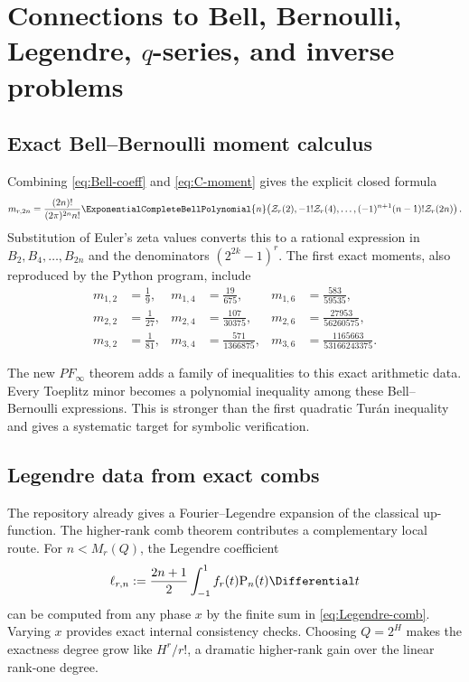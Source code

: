 \documentclass[11pt,oneside]{article}
\theoremstyle{definition}
\theoremstyle{remark}
\newcommand{\ZetaR}{\mathcal Z}
\begin{document}
\section{Connections to Bell, Bernoulli, Legendre, \texorpdfstring{$q$}{q}-series, and inverse problems}

\subsection{Exact Bell--Bernoulli moment calculus}

Combining \eqref{eq:Bell-coeff} and \eqref{eq:C-moment} gives the explicit
closed formula
\begin{equation}\label{eq:moment-Bell}
 m_{r,2n}=\frac{(2n)!}{(2\pi)^{2n}n!}
 \ExponentialCompleteBellPolynomial{n}\!\left(
 \ZetaR_r(2),-1!\ZetaR_r(4),\ldots,
 (-1)^{n+1}(n-1)!\ZetaR_r(2n)
 \right).
\end{equation}
Substitution of Euler's zeta values converts this to a rational expression in
$B_2,B_4,\ldots,B_{2n}$ and the denominators
$(2^{2k}-1)^r$.  The first exact moments, also reproduced by the Python
program, include
\begin{align*}
 m_{1,2}&=\frac19,&m_{1,4}&=\frac{19}{675},&m_{1,6}&=\frac{583}{59535},\\
 m_{2,2}&=\frac1{27},&m_{2,4}&=\frac{107}{30375},&m_{2,6}&=\frac{27953}{56260575},\\
 m_{3,2}&=\frac1{81},&m_{3,4}&=\frac{571}{1366875},&m_{3,6}&=\frac{1165663}{53166243375}.
\end{align*}

The new $PF_\infty$ theorem adds a family of inequalities to this exact
arithmetic data.  Every Toeplitz minor becomes a polynomial inequality among
these Bell--Bernoulli expressions.  This is stronger than the first quadratic
Tur\'an inequality and gives a systematic target for symbolic verification.

\subsection{Legendre data from exact combs}

The repository already gives a Fourier--Legendre expansion of the classical
up-function.  The higher-rank comb theorem contributes a complementary local
route.  For $n<M_r(Q)$, the Legendre coefficient
\begin{equation}\label{eq:Legendre-coeff}
 \ell_{r,n}:=\frac{2n+1}{2}\int_{-1}^{1}f_r(t)\mathrm P_n(t)\Differential t
\end{equation}
can be computed from any phase $x$ by the finite sum in
\eqref{eq:Legendre-comb}.  Varying $x$ provides exact internal consistency
checks.  Choosing $Q=2^H$ makes the exactness degree grow like
$H^r/r!$, a dramatic higher-rank gain over the linear rank-one degree.
\end{document}
